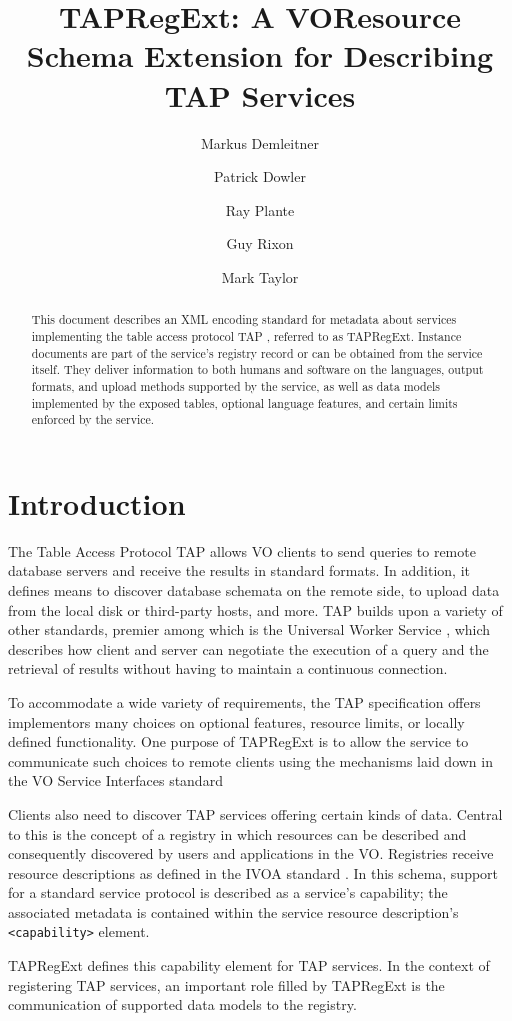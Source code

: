 \documentclass{ivoa}
\author[http://www.ivoa.net/cgi-bin/twiki/bin/view/IVOA/MarkusDemleitner]{Markus
Demleitner}
\author[http://www.ivoa.net/cgi-bin/twiki/bin/view/IVOA/PatrickDowler]{Patrick
Dowler}
\author[http://www.ivoa.net/cgi-bin/twiki/bin/view/IVOA/RayPlante]{Ray
Plante}
\author[http://www.ivoa.net/cgi-bin/twiki/bin/view/IVOA/GuyRixon]{Guy
Rixon}
\author[http://www.ivoa.net/cgi-bin/twiki/bin/view/IVOA/MarkTaylor]{Mark
Taylor}
\title{TAPRegExt: A VOResource Schema Extension for Describing TAP Services}
\begin{document}
\begin{abstract}
This document describes an XML encoding standard for metadata about
services implementing the table access protocol TAP \citep{std:TAP}, referred to as TAPRegExt.  Instance documents are
part of the service's registry record or can be obtained from the service
itself.  They deliver information to both humans and software on the languages,
output formats, and upload methods supported by the service, as well as data
models implemented by the exposed tables, optional language features,
and certain limits enforced by the service.
\end{abstract}


\section{Introduction}

\label{introduction}

The Table Access Protocol TAP \citep{std:TAP} allows
VO clients to send queries to remote database servers and receive the
results in standard formats.  In addition, it defines means to discover
database schemata on the remote side, to upload data from the local disk
or third-party hosts, and more.  TAP builds upon a variety of other
standards, premier among which is the Universal Worker Service 
\citep{std:UWS}, which describes how client and server
can negotiate the execution of a query and the retrieval of results
without having to maintain a continuous connection.

To accommodate a wide variety of requirements, the TAP specification
offers implementors many choices on optional features, resource limits, or
locally defined functionality.  One purpose of TAPRegExt is to allow the
service to communicate such choices to remote clients using the mechanisms
laid down in the VO Service Interfaces standard \citep{std:VOSI}

Clients also need to discover TAP services offering certain kinds of data.
Central to this is the concept of a registry in which resources can be
described and consequently discovered by users and applications in the VO.
Registries receive resource descriptions as defined in the IVOA standard 
\citep{std:VOR}. In this schema, support for 
a standard service protocol is described as a service's capability; the
associated metadata is contained within the service resource description's
\texttt{<capability>} element.

TAPRegExt defines this capability element for TAP services.  In the context
of registering TAP services, an important role filled by TAPRegExt is the 
communication of supported data models to the registry.
\end{document}
